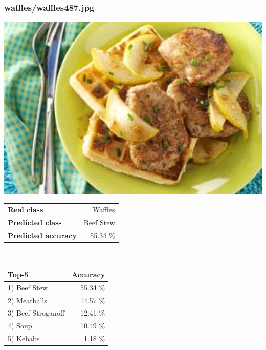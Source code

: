 \subsubsection{waffles/waffles487.jpg}

\begin{minipage}[t]{0.4\textwidth}
	\vspace{0pt}
	\includegraphics[width=\linewidth]{images/evaluation-images/waffles/waffles487.jpg}
\end{minipage}
\hfill
\begin{minipage}[t]{0.5\textwidth}
	\vspace{0pt}\raggedright
	\begin{tabularx}{\textwidth}{X r}
		\small \textbf{Real class} & \small Waffles\\
		\small \textbf{Predicted class} & \small Beef Stew\\
		\small \textbf{Predicted accuracy} & \small 55.34 \%
    \end{tabularx}\\
    
    \vspace{6pt}
	\begin{tabularx}{\textwidth}{X r}
        \small \textbf{Top-5} & \small \textbf{Accuracy} \\
        \hline
		\small 1) Beef Stew & \small 55.34 \%\\\small 2) Meatballs & \small 14.57 \%\\\small 3) Beef Stroganoff & \small 12.41 \%\\\small 4) Soup & \small 10.49 \%\\\small 5) Kebabs & \small 1.18 \%
    \end{tabularx}
\end{minipage}
    
